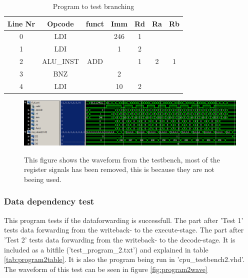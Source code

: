\documentclass[11pt]{report}
\begin{document}
\begin{table}[htbp]
  \centering
  \begin{tabular}{|c|c|c|c|c|c|c|}
    \hline
    Line Nr &	Opcode		&	funct	&	Imm	&	Rd	&	Ra	&	Rb	\\\hline
    	0	&	LDI			&			&	246	&	1	&		&		\\\hline
    	1	&	LDI			&			&	1	&	2	&		&		\\\hline
    	2	&	ALU\_INST	&	ADD		&		&	1	&	2	&	1	\\\hline
    	3	&	BNZ			&			&	2	&		&		&		\\\hline
    	4	&	LDI			&			&	10	&	2	&		&		\\\hline
  \end{tabular}
  \caption{Program to test branching}
  \label{tab:program1table}
\end{table}

\begin{figure}
  \centering
  \includegraphics[width=.95\linewidth]{test1.png} \\
  \caption{This figure shows the waveform from the testbench, 
  most of the register signals has been removed, this is because they are not beeing used.}
  \label{fig:program1wave}
\end{figure}


\subsubsection*{Data dependency test}

This program tests if the dataforwarding is successfull. The part after 'Test 1' tests data forwarding
from the writeback- to the execute-stage. The part after 'Test 2' tests data forwarding from the
writeback- to the decode-stage. It is included as a bitfile ('test\_program\_2.txt') and explained
in table \ref{tab:program2table}. It is also the program being run in 'cpu\_testbench2.vhd'.
The waveform of this test can be seen in figure \ref{fig:program2wave}
\end{document}
